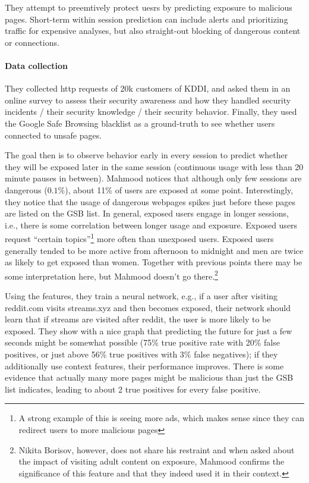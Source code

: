 \documentclass{article}
\begin{document}
They attempt to preemtively protect uesrs by predicting exposure to malicious pages. Short-term within session prediction can include alerts and prioritizing traffic for expensive analyses, but also straight-out blocking of dangerous content or connections.

\paragraph{Data collection} They collected http requests of 20k customers of KDDI, and asked them in an online survey to assess their security awareness and how they handled security incidents / their security knowledge / their security behavior.
Finally, they used the Google Safe Browsing blacklist as a ground-truth to see whether users connected to unsafe pages.

The goal then is to observe behavior early in every session to predict whether they will be exposed later in the same session (continuous usage with less than 20 minute pauses in between). Mahmood notices that although only few sessions are dangerous ($0.1\%$), about 11\% of users are exposed at some point. Interestingly, they notice that the usage of dangerous webpages spikes just before these pages are listed on the GSB list. In general, exposed users engage in longer sessions, i.e., there is some correlation between longer usage and exposure. Exposed users request ``certain topics''\footnote{A strong example of this is seeing more ads, which makes sense since they can redirect users to more malicious pages} more often than unexposed users. Exposed users generally tended to be more active from afternoon to midnight and men are twice as likely to get exposed than women. Together with previous points there may be some interpretation here, but Mahmood doesn't go there.\footnote{Nikita Borisov, however, does not share his restraint and when asked about the impact of visiting adult content on exposure, Mahmood confirms the significance of this feature and that they indeed used it in their context.}

Using the features, they train a neural network, e.g., if a user after visiting reddit.com visits streams.xyz and then becomes exposed, their network should learn that if streams are visited after reddit, the user is more likely to be exposed. They show with a nice graph that predicting the future for just a few seconds might be somewhat possible (75\% true positive rate with 20\% false positives, or just above 56\% true positives with 3\% false negatives); if they additionally use context features, their performance improves. There is some evidence that actually many more pages might be malicious than just the GSB list indicates, leading to about 2 true positives for every false positive.
\end{document}
